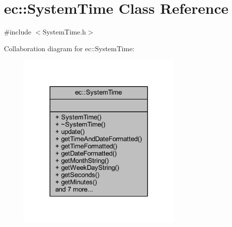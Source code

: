 \hypertarget{classec_1_1_system_time}{}\section{ec\+:\+:System\+Time Class Reference}
\label{classec_1_1_system_time}


{\ttfamily \#include $<$System\+Time.\+h$>$}



Collaboration diagram for ec\+:\+:System\+Time\+:\nopagebreak
\begin{figure}[H]
\begin{center}
\leavevmode
\includegraphics[width=228pt]{classec_1_1_system_time__coll__graph}
\end{center}
\end{figure}
